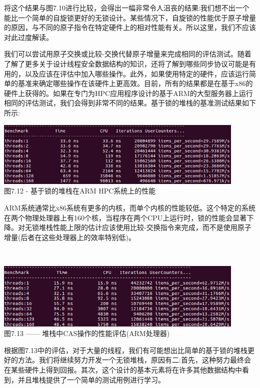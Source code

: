 将这个结果与图7.10进行比较，会得出一幅非常令人沮丧的结果:我们想不出一个能比一个简单的自旋锁更好的无锁设计。某些情况下，自旋锁的性能优于原子增量的原因，与不同的原子指令在特定硬件上的相对性能有关。所以这里，我们不应该对此过度解读。

我们可以尝试用原子交换或比较-交换代替原子增量来完成相同的评估测试。随着了解了更多关于设计线程安全数据结构的知识，还将了解到哪些同步协议可能是有用的，以及应该在评估中加入哪些操作。此外，如果使用特定的硬件，应该运行简单的基准来确定哪些操作在该硬件上更高效。目前，所有的结果都是在基于x86的硬件上获得的。如果在专门为HPC应用程序设计的基于ARM的大型服务器上运行相同的评估测试，我们会得到非常不同的结果。基于锁的堆栈的基准测试结果如下所示:

\begin{center}
\includegraphics[width=0.9\textwidth]{content/2/chapter7/images/12.jpg}\\
图7.12 - 基于锁的堆栈在ARM HPC系统上的性能
\end{center}

ARM系统通常比x86系统有更多的内核，而单个内核的性能较低。这个特定的系统在两个物理处理器上有160个核，当程序在两个CPU上运行时，锁的性能会显著下降。对无锁堆栈性能上限的估计应该使用比较-交换指令来完成，而不是使用原子增量(后者在这些处理器上的效率特别低)。

\hspace*{\fill} \\ %
\begin{center}
\includegraphics[width=0.9\textwidth]{content/2/chapter7/images/13.jpg}\\
图7.13 —— 堆栈中CAS操作的性能评估(ARM处理器)
\end{center}

根据图7.13中的评估，对于大量的线程，我们有可能想出比简单的基于锁的堆栈更好的方法。我们将继续努力开发一个无锁堆栈，原因有二:首先，这种努力最终会在某些硬件上得到回报。其次，这个设计的基本元素将在许多其他数据结构中看到，并且堆栈提供了一个简单的测试用例进行学习。

